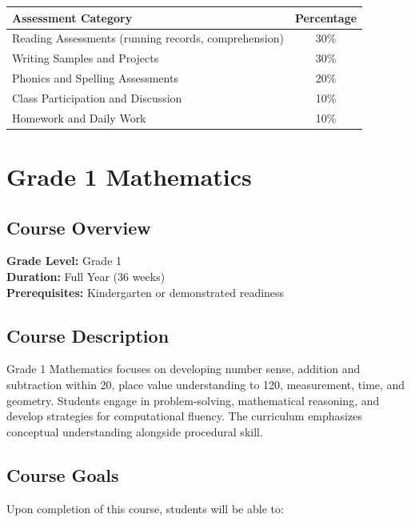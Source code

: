 \documentclass[11pt,letterpaper]{report}
\begin{document}
\begin{center}
\begin{tabular}{|l|c|}
\hline
\textbf{Assessment Category} & \textbf{Percentage} \\
\hline
Reading Assessments (running records, comprehension) & 30\% \\
\hline
Writing Samples and Projects & 30\% \\
\hline
Phonics and Spelling Assessments & 20\% \\
\hline
Class Participation and Discussion & 10\% \\
\hline
Homework and Daily Work & 10\% \\
\hline
\end{tabular}
\end{center}

\chapter{Grade 1 Mathematics}

\section{Course Overview}

\textbf{Grade Level:} Grade 1\\
\textbf{Duration:} Full Year (36 weeks)\\
\textbf{Prerequisites:} Kindergarten or demonstrated readiness

\section{Course Description}

Grade 1 Mathematics focuses on developing number sense, addition and subtraction within 20, place value understanding to 120, measurement, time, and geometry. Students engage in problem-solving, mathematical reasoning, and develop strategies for computational fluency. The curriculum emphasizes conceptual understanding alongside procedural skill.

\section{Course Goals}

Upon completion of this course, students will be able to:
\end{document}
